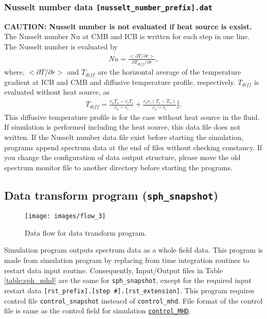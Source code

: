 \subsubsection{Nusselt number data {\tt [nusselt\_number\_prefix].dat}}
{\bf CAUTION: Nusselt number is not evaluated if heat source is exsist.}
The Nusselt number Nu at CMB and ICB is written for each step in one line. The Nusselt number is evaluated by
%
\begin{eqnarray*}
Nu = \frac{<\partial T / \partial r>}{\partial T_{diff}/ \partial r},
\end{eqnarray*}
where, $<\partial T / \partial r>$ and $T_{diff}$ are the horizontal average of the temperature gradient at ICB and CMB and diffusive temperature profile, respectively. $T_{diff}$ is evaluated without heat source, as
\begin{eqnarray*}
T_{diff} = \frac{r_{o}T_{o} - r_{i}T_{i}}{r_{o} - r_{i}}
    +  \frac{r_{o}r_{i}\left(T_{i} - T_{o}\right)}{r_{o} - r_{i}} \frac{1}{r}.
\end{eqnarray*}
%
This diffusive temperature profile is for the case without heat source in the fluid. If simulation is performed including the heat source, this data file does not written.
If the Nusselt number data file exist before starting the simulation, programs append spectrum data at the end of files without checking constancy. If you change the configuration of data output structure, please move the old spectrum monitor file to another directory before starting the programs.


\newpage
\subsection{Data transform program ({\tt sph\_snapshot})}
\label{section:sph_snapshot}
%
\begin{figure}[htbp]
\begin{center}
\texttt{[image: images/flow\_3]}
\end{center}
\caption{Data flow for data transform program.}
\label{fig:flow_3}
\end{figure}
%
Simulation program outputs spectrum data as a whole field data. This program is made from simulation program by replacing from time integration routines to restart data input routine. Consequently, Input/Output files in Table \ref{table:sph_mhd} are the same for {\tt sph\_snapshot}, except for the required input restart data \verb|[rst_prefix].[step #].[rst_extension]|.
%
This program requires control file \verb|control_snapshot| insteacd of \verb|control_mhd|. File format of the control file is same as the control field for simulation \hyperref[href_i:MHD_control]{\tt control\_MHD}.

